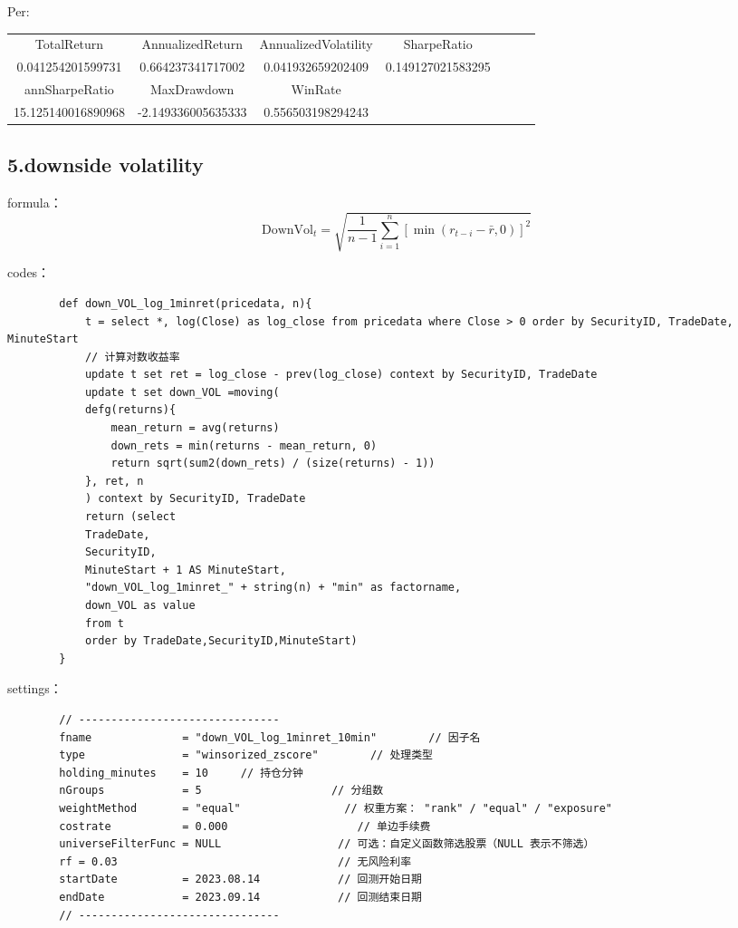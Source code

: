 \documentclass[10pt,a4paper]{article}
\begin{document}
	Per:
	\begin{table}[H]
		\begin{tabular}{@{}|c|c|c|llll@{}}
			\cmidrule(r){1-4}
			TotalReturn        & AnnualizedReturn   & AnnualizedVolatility & \multicolumn{1}{c|}{SharpeRatio}       &  &  &  \\ \cmidrule(r){1-4}
			0.041254201599731  & 0.664237341717002  & 0.041932659202409    & \multicolumn{1}{c|}{0.149127021583295} &  &  &  \\ \cmidrule(r){1-4}
			annSharpeRatio     & MaxDrawdown        & WinRate              &                                        &  &  &  \\ \cmidrule(r){1-3}
			15.125140016890968 & -2.149336005635333 & 0.556503198294243    &                                        &  &  &  \\ \cmidrule(r){1-3}
		\end{tabular}
	\end{table}
	
	\subsection*{5.downside volatility}
	formula：
	\[ \text{DownVol}_t = \sqrt{\frac{1}{n-1} \sum_{i=1}^{n} \left[\min\left(r_{t-i}-\bar{r}, 0\right)\right]^2} \]
	
	codes：
	\begin{lstlisting}
		def down_VOL_log_1minret(pricedata, n){
			t = select *, log(Close) as log_close from pricedata where Close > 0 order by SecurityID, TradeDate, MinuteStart
			// 计算对数收益率
			update t set ret = log_close - prev(log_close) context by SecurityID, TradeDate
			update t set down_VOL =moving(
			defg(returns){
				mean_return = avg(returns)
				down_rets = min(returns - mean_return, 0)
				return sqrt(sum2(down_rets) / (size(returns) - 1))
			}, ret, n
			) context by SecurityID, TradeDate
			return (select
			TradeDate,
			SecurityID,
			MinuteStart + 1 AS MinuteStart,
			"down_VOL_log_1minret_" + string(n) + "min" as factorname,
			down_VOL as value
			from t
			order by TradeDate,SecurityID,MinuteStart)
		}
	\end{lstlisting}
	
	settings：
	\begin{lstlisting}
		// -------------------------------
		fname              = "down_VOL_log_1minret_10min"        // 因子名
		type               = "winsorized_zscore"        // 处理类型
		holding_minutes    = 10     // 持仓分钟
		nGroups            = 5                    // 分组数
		weightMethod       = "equal"                // 权重方案： "rank" / "equal" / "exposure"
		costrate           = 0.000                    // 单边手续费
		universeFilterFunc = NULL                  // 可选：自定义函数筛选股票（NULL 表示不筛选）
		rf = 0.03                                  // 无风险利率
		startDate          = 2023.08.14            // 回测开始日期
		endDate            = 2023.09.14            // 回测结束日期
		// -------------------------------
	\end{lstlisting}
	
\end{document}
